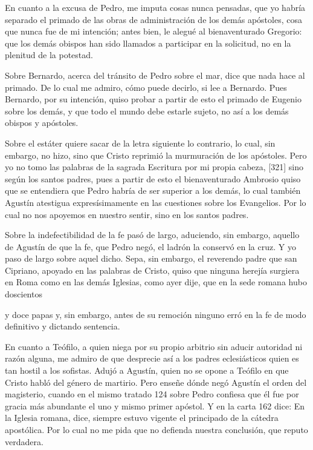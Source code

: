 En cuanto a la excusa de Pedro, me imputa cosas nunca pensadas, que yo habría separado el primado de las obras de administración de los demás apóstoles, cosa que nunca fue de mi intención; antes bien, le alegué al bienaventurado Gregorio: que los demás obispos han sido llamados a participar en la solicitud, no en la plenitud de la potestad.

Sobre Bernardo, acerca del tránsito de Pedro sobre el mar, dice que nada hace al primado. De lo cual me admiro, cómo puede decirlo, si lee a Bernardo. Pues Bernardo, por su intención, quiso probar a partir de esto el primado de Eugenio sobre los demás, y que todo el mundo debe estarle sujeto, no así a los demás obispos y apóstoles.

Sobre el estáter quiere sacar de la letra siguiente lo contrario, lo cual, sin embargo, no hizo, sino que Cristo reprimió la murmuración de los apóstoles. Pero yo no tomo las palabras de la sagrada Escritura por mi propia cabeza, [321] sino según los santos padres, pues a partir de esto el bienaventurado Ambrosio quiso que se entendiera que Pedro habría de ser superior a los demás, lo cual también Agustín atestigua expresísimamente en las cuestiones sobre los Evangelios. Por lo cual no nos apoyemos en nuestro sentir, sino en los santos padres.

Sobre la indefectibilidad de la fe pasó de largo, aduciendo, sin embargo, aquello de Agustín de que la fe, que Pedro negó, el ladrón la conservó en la cruz. Y yo paso de largo sobre aquel dicho. Sepa, sin embargo, el reverendo padre que san Cipriano, apoyado en las palabras de Cristo, quiso que ninguna herejía surgiera en Roma como en las demás Iglesias, como ayer dije, que en la sede romana hubo doscientos

y doce papas y, sin embargo, antes de su remoción ninguno erró en la fe de modo definitivo y dictando sentencia.

En cuanto a Teófilo, a quien niega por su propio arbitrio sin aducir autoridad ni razón alguna, me admiro de que desprecie así a los padres eclesiásticos quien es tan hostil a los sofistas. Adujó a Agustín, quien no se opone a Teófilo en que Cristo habló del género de martirio. Pero enseñe dónde negó Agustín el orden del magisterio, cuando en el mismo tratado 124 sobre Pedro confiesa que él fue por gracia más abundante el uno y mismo primer apóstol. Y en la carta 162 dice: En la Iglesia romana, dice, siempre estuvo vigente el principado de la cátedra apostólica. Por lo cual no me pida que no defienda nuestra conclusión, que reputo verdadera.

